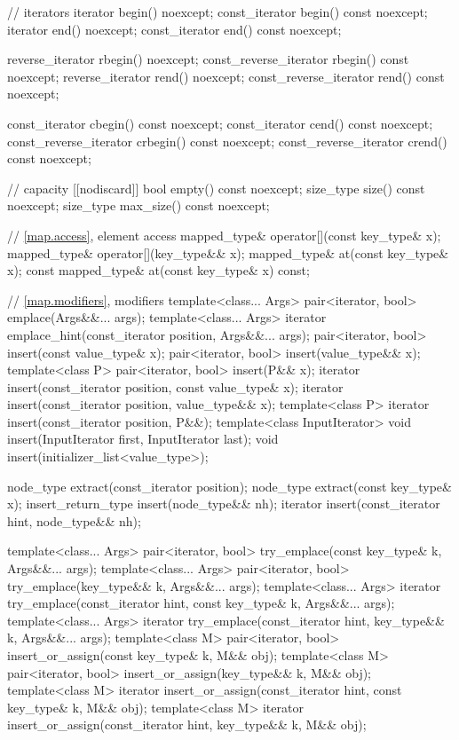 \begin{codeblock}
{{    // iterators
    iterator               begin() noexcept;
    const_iterator         begin() const noexcept;
    iterator               end() noexcept;
    const_iterator         end() const noexcept;

    reverse_iterator       rbegin() noexcept;
    const_reverse_iterator rbegin() const noexcept;
    reverse_iterator       rend() noexcept;
    const_reverse_iterator rend() const noexcept;

    const_iterator         cbegin() const noexcept;
    const_iterator         cend() const noexcept;
    const_reverse_iterator crbegin() const noexcept;
    const_reverse_iterator crend() const noexcept;

    // capacity
    [[nodiscard]] bool empty() const noexcept;
    size_type size() const noexcept;
    size_type max_size() const noexcept;

    // \ref{map.access}, element access
    mapped_type& operator[](const key_type& x);
    mapped_type& operator[](key_type&& x);
    mapped_type&       at(const key_type& x);
    const mapped_type& at(const key_type& x) const;

    // \ref{map.modifiers}, modifiers
    template<class... Args> pair<iterator, bool> emplace(Args&&... args);
    template<class... Args> iterator emplace_hint(const_iterator position, Args&&... args);
    pair<iterator, bool> insert(const value_type& x);
    pair<iterator, bool> insert(value_type&& x);
    template<class P> pair<iterator, bool> insert(P&& x);
    iterator insert(const_iterator position, const value_type& x);
    iterator insert(const_iterator position, value_type&& x);
    template<class P>
      iterator insert(const_iterator position, P&&);
    template<class InputIterator>
      void insert(InputIterator first, InputIterator last);
    void insert(initializer_list<value_type>);

    node_type extract(const_iterator position);
    node_type extract(const key_type& x);
    insert_return_type insert(node_type&& nh);
    iterator           insert(const_iterator hint, node_type&& nh);

    template<class... Args>
      pair<iterator, bool> try_emplace(const key_type& k, Args&&... args);
    template<class... Args>
      pair<iterator, bool> try_emplace(key_type&& k, Args&&... args);
    template<class... Args>
      iterator try_emplace(const_iterator hint, const key_type& k, Args&&... args);
    template<class... Args>
      iterator try_emplace(const_iterator hint, key_type&& k, Args&&... args);
    template<class M>
      pair<iterator, bool> insert_or_assign(const key_type& k, M&& obj);
    template<class M>
      pair<iterator, bool> insert_or_assign(key_type&& k, M&& obj);
    template<class M>
      iterator insert_or_assign(const_iterator hint, const key_type& k, M&& obj);
    template<class M>
      iterator insert_or_assign(const_iterator hint, key_type&& k, M&& obj);

}}
\end{codeblock}
